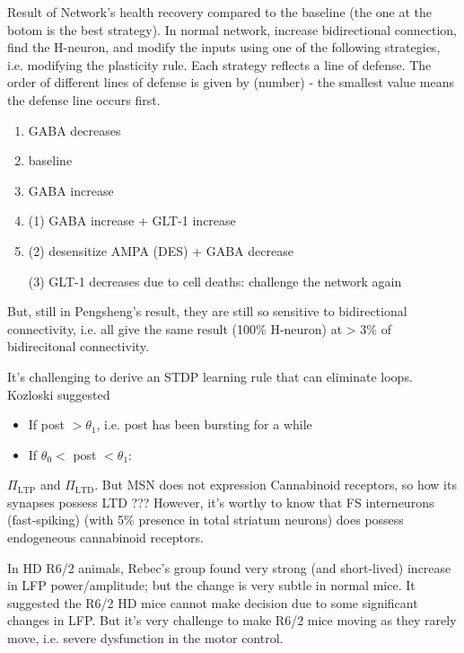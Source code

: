 Result of Network's health recovery compared to the baseline (the one at the
botom is the best strategy). 
In normal network, increase bidirectional connection, find the H-neuron, and
modify the inputs using one of the following strategies, i.e. modifying the
plasticity rule. Each strategy reflects a line of defense. The order of
different lines of defense is given by (number) - the smallest value means the defense line occurs first.
\begin{enumerate}
  \item GABA decreases

  \item baseline
    
  \item GABA increase
  
  \item (1) GABA increase + GLT-1 increase
  
  \item (2) desensitize AMPA (DES) + GABA decrease
  
  (3) GLT-1 decreases due to cell deaths: challenge the network again
\end{enumerate}
But, still in Pengsheng's result, they are still so sensitive to bidirectional
connectivity, i.e. all give the same result (100\% H-neuron) at > 3\% of
bidirecitonal connectivity.

It's challenging to derive an STDP learning rule that can eliminate loops.
Kozloski suggested
\begin{itemize}
  \item  If post $> \theta_1$, i.e. post has been bursting for a while
  
  
  \item If $\theta_0 <$ post $< \theta_1$: 
\end{itemize}
$\Pi_\text{LTP}$ and $\Pi_\text{LTD}$.
But MSN does not expression Cannabinoid receptors, so how its synapses possess
LTD ??? However, it's worthy to know that FS interneurons (fast-spiking)
(with 5\% presence in total striatum neurons) does possess endogeneous
cannabinoid receptors.

In HD R6/2 animals, Rebec's group found very strong (and short-lived) increase 
in LFP power/amplitude; but the change is very subtle in normal mice. It
suggested the R6/2 HD mice cannot make decision due to some significant changes
in LFP. But it's very challenge to make R6/2 mice moving as they rarely move,
i.e. severe dysfunction in the motor control.



